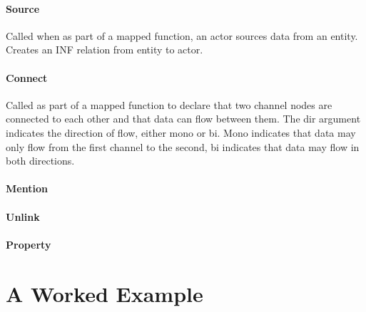\documentclass[12pt,twoside,a4paper]{article}
\begin{document}
\paragraph{Source}
Called when as part of a mapped function, an actor sources data from an entity.
Creates an INF relation from entity to actor.

\paragraph{Connect}
Called as part of a mapped function to declare that two channel nodes are connected to each other and that data can flow between them. The dir argument indicates the direction of flow, either mono or bi. Mono indicates that data may only flow from the first channel to the second, bi indicates that data may flow in both directions. 

\paragraph{Mention}

\paragraph{Unlink}

\paragraph{Property}

\section{A Worked Example}
\end{document}
